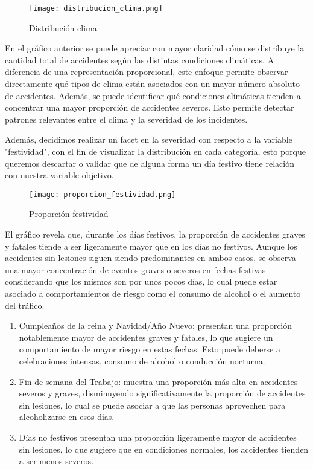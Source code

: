 \documentclass{book}
\begin{document}
\begin{figure}[htbp]
\centering
\texttt{[image: distribucion\_clima.png]}
\caption{\label{fig:distribución clima}Distribución clima}
\end{figure}

En el gráfico anterior se puede apreciar con mayor claridad cómo se distribuye la cantidad total de accidentes según las distintas condiciones climáticas. A diferencia de una representación proporcional, este enfoque permite observar directamente qué tipos de clima están asociados con un mayor número absoluto de accidentes. Además, se puede identificar qué condiciones climáticas tienden a concentrar una mayor proporción de accidentes severos. Esto permite detectar patrones relevantes entre el clima y la severidad de los incidentes.

Además, decidimos realizar un facet en la severidad con respecto a la variable "festividad", con el fin de visualizar la distribución en cada categoría, esto porque queremos descartar o validar que de alguna forma un día festivo tiene relación con nuestra variable objetivo.

\begin{figure}[htbp]
\centering
\texttt{[image: proporcion\_festividad.png]}
\caption{\label{fig:proporción festividad}Proporción festividad}
\end{figure}

El gráfico revela que, durante los días festivos, la proporción de accidentes graves y fatales tiende a ser ligeramente mayor que en los días no festivos. Aunque los accidentes sin lesiones siguen siendo predominantes en ambos casos, se observa una mayor concentración de eventos graves o severos en fechas festivas considerando que los mismos son por unos pocos días, lo cual puede estar asociado a comportamientos de riesgo como el consumo de alcohol o el aumento del tráfico.

\begin{enumerate}

\item Cumpleaños de la reina y Navidad/Año Nuevo: presentan una proporción notablemente mayor de accidentes graves y fatales, lo que sugiere un comportamiento de mayor riesgo en estas fechas. Esto puede deberse a celebraciones intensas, consumo de alcohol o conducción nocturna.

\item Fin de semana del Trabajo: muestra una proporción más alta en accidentes severos y graves, disminuyendo significativamente la proporción de accidentes sin lesiones, lo cual se puede asociar a que las personas aprovechen para alcoholizarse en esos días.

\item Días no festivos presentan una proporción ligeramente mayor de accidentes sin lesiones, lo que sugiere que en condiciones normales, los accidentes tienden a ser menos severos.

\end{enumerate}
\end{document}
